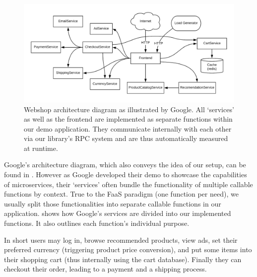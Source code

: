 \documentclass[../main.tex]{subfiles}
\begin{document}
\begin{figure}[]
\begin{center}
  \includegraphics[width=\linewidth,keepaspectratio]{./webshop-architecture-diagram.png}
\end{center}
\caption[Webshop Architecture Diagram]{%
  Webshop architecture diagram as illustrated by Google\protect\footnotemark.
  All `services' as well as the frontend are implemented as separate functions within our demo application. 
  They communicate internally with each other via our library's RPC system and are thus automatically measured at runtime.%
}%
\label{fig:webshopArchitectureDiagram}
\end{figure}

Google's architecture diagram, which also conveys the idea of our setup, can be found in .
However as Google developed their demo to showcase the capabilities of microservices, 
their `services' often bundle the functionality of multiple callable functions by context.
True to the FaaS paradigm (one function per need), 
we usually split those functionalities into separate callable functions in our application.
 shows how Google's services are divided into our implemented functions.
It also outlines each function's individual purpose.

In short users may log in, browse recommended products, view ads, set their preferred currency (triggering product price conversion),
and put some items into their shopping cart (thus internally using the cart database).
Finally they can checkout their order, leading to a payment and a shipping process.
\end{document}
